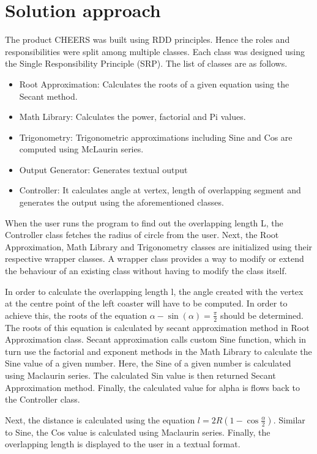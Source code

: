 \section{Solution approach}
  \begin{flushleft}
    The product CHEERS was built using RDD principles. Hence the roles and responsibilities were split among multiple classes. Each class was designed using the Single Responsibility Principle (SRP). The list of classes are as follows.
    \begin{itemize}
      \item Root Approximation: Calculates the roots of a given equation using the Secant method.
      \item Math Library: Calculates the power, factorial and Pi values.
      \item Trigonometry: Trigonometric approximations including Sine and Cos are computed using McLaurin series.
      \item Output Generator: Generates textual output
      \item Controller: It calculates angle at vertex, length of overlapping segment and generates the output using the aforementioned classes.
    \end{itemize}

    When the user runs the program to find out the overlapping length L, the Controller class fetches the radius of circle from the user. Next, the Root Approximation, Math Library and Trigonometry classes are initialized using their respective wrapper classes. A wrapper class provides a way to modify or extend the behaviour of an existing class without having to modify the class itself. 
    \end{flushleft}
    \begin{flushleft}
      In order to calculate the overlapping length l, the angle created with the vertex at the centre point of the left coaster will have to be computed. In order to achieve this, the roots of the equation $\alpha - \sin(\alpha) = \frac{\pi}{2}$ should be determined. 
      The roots of this equation is calculated by secant approximation method in Root Approximation class. Secant approximation calls custom Sine function, which in turn use the factorial and exponent methods in the Math Library to calculate the Sine value of a given number. 
      Here, the Sine of a given number is calculated using Maclaurin series. The calculated Sin value is then returned Secant Approximation method. 
      Finally, the calculated value for alpha is flows back to the Controller class.
    \end{flushleft}
    \begin{flushleft}
      Next, the distance is calculated using the equation $l = 2R\left(1 - \cos\frac{\alpha}{2}\right)$. Similar to Sine, the Cos value is calculated using Maclaurin series. Finally, the overlapping length is displayed to the user in a textual format.
  \end{flushleft}
    \pagebreak

